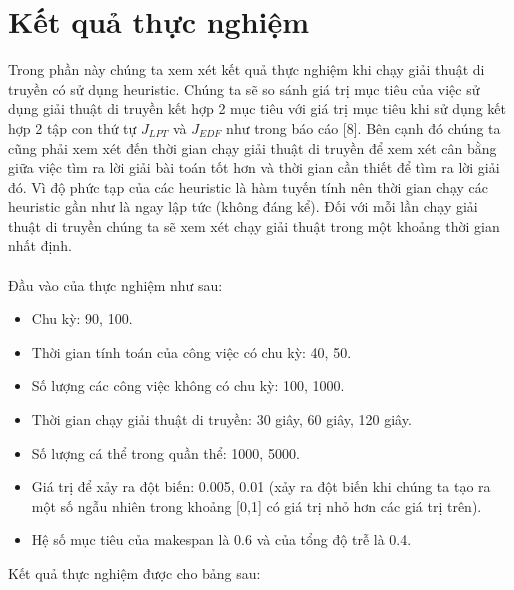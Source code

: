 \documentclass[a4paper,12pt]{article}
\begin{document}
\section{Kết quả thực nghiệm}
Trong phần này chúng ta xem xét kết quả thực nghiệm khi chạy giải thuật di truyền có sử dụng heuristic. Chúng ta sẽ so sánh  giá trị mục tiêu của việc sử dụng giải thuật di truyền kết hợp 2 mục tiêu với giá trị mục tiêu khi sử dụng kết hợp 2 tập con thứ tự $J_{LPT}$ và $J_{EDF}$ như trong báo cáo [8]. Bên cạnh đó chúng ta cũng phải xem xét đến thời gian chạy giải thuật di truyền để xem xét cân bằng giữa việc tìm ra lời giải bài toán tốt hơn và thời gian cần thiết để tìm ra lời giải đó. Vì độ phức tạp của các heuristic là hàm tuyến tính nên thời gian chạy các heuristic gần như là ngay lập tức (không đáng kể). Đối với mỗi lần chạy giải thuật di truyền chúng ta sẽ xem xét chạy giải thuật trong một khoảng thời gian nhất định.\\\\
Đầu vào của thực nghiệm như sau:
\begin{itemize}
\item
Chu kỳ: 90, 100.
\item
Thời gian tính toán của công việc có chu kỳ: 40, 50.
\item
Số lượng các công việc không có chu kỳ: 100, 1000.
\item
Thời gian chạy giải thuật di truyền: 30 giây, 60 giây, 120 giây.
\item
Số lượng cá thể trong quần thể: 1000, 5000.
\item
Giá trị để xảy ra đột biến: 0.005, 0.01 (xảy ra đột biến khi chúng ta tạo ra một số ngẫu nhiên trong khoảng [0,1] có giá trị nhỏ hơn các giá trị trên).
\item
Hệ số mục tiêu của makespan là 0.6 và của tổng độ trễ là 0.4.
\end{itemize}
Kết quả thực nghiệm được cho bảng sau:\\\\
\end{document}

